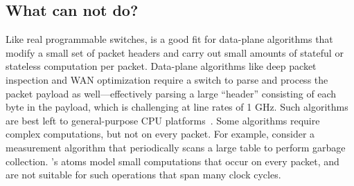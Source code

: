 \subsection{What can \absmachine not do?}
\label{ss:limitations}

Like real programmable switches, \absmachine is a good fit for data-plane
algorithms that modify a small set of packet headers and carry out small
amounts of stateful or stateless computation per packet. Data-plane algorithms
like deep packet inspection and WAN optimization require a switch to parse and
process the packet payload as well---effectively parsing a large ``header''
consisting of each byte in the payload, which is challenging at line rates of 1
GHz. Such algorithms are best left to general-purpose CPU platforms~\cite{e2}.
Some algorithms require complex computations, but not on every
packet.  For example, consider a measurement algorithm that periodically scans
a large table to perform garbage collection.  \absmachine's atoms model small
computations that occur on every packet, and are not suitable for such
operations that span many clock cycles.
